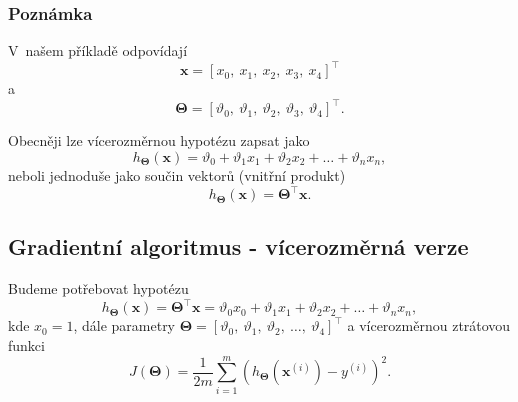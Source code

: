 \subsubsection*{Poznámka}
\par{V~našem příkladě odpovídají
\begin{equation}
	\bm{x} = \left[ x_0,~x_1,~x_2,~x_3,~x_4 \right]^{\top}
\end{equation}
a
\begin{equation}
	\bm{\Theta} = \left[ \vartheta_0,~\vartheta_1,~\vartheta_2,~\vartheta_3,~\vartheta_4 \right]^{\top}.
\end{equation}}

\par{Obecněji lze vícerozměrnou hypotézu zapsat jako
\begin{equation}
	h_{\bm{\Theta}} \left( \bm{x} \right) = \vartheta_0 + \vartheta_1 x_1 + \vartheta_2 x_2 + \ldots + \vartheta_n x_n,
	\label{eq:NDhypothesisObecne}
\end{equation}
neboli jednoduše jako součin vektorů (vnitřní produkt)
\begin{equation}
	h_{\bm{\Theta}} \left( \bm{x} \right) = \bm{\Theta}^{\top} \bm{x}.
	\label{eq:NDhypothesisObecneVektorove}
\end{equation}}


\newpage












\subsection{Gradientní algoritmus - vícerozměrná verze}
\label{sec:LinearniRegreseGradientDescentVicerozmerny}

\par{Budeme potřebovat hypotézu
\begin{equation}
	h_{\bm{\Theta}} \left( \bm{x} \right) = \bm{\Theta}^{\top} \bm{x} = \vartheta_0 x_0 + \vartheta_1 x_1 + \vartheta_2 x_2 + \ldots + \vartheta_n x_n,
\end{equation}
kde $x_0 = 1$, dále parametry $\bm{\Theta} = \left[ \vartheta_0,~\vartheta_1,~\vartheta_2,~\ldots,~\vartheta_4 \right]^{\top}$ a vícerozměrnou ztrátovou funkci
\begin{equation}
	J \left( \bm{\Theta} \right) = \frac{1}{2m} \sum_{i = 1}^{m} \left( h_{\bm{\Theta}} \left( \bm{x}^{\left( i \right)} \right) - y^{\left( i \right)} \right)^2.
\end{equation}}


